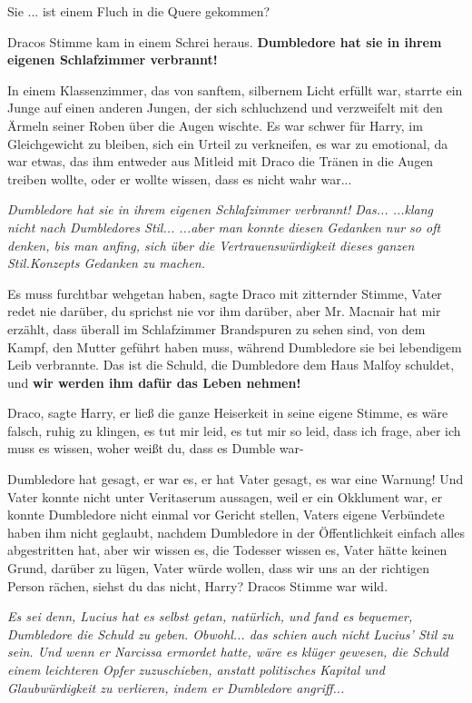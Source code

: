 \glqq Sie ... ist einem Fluch in die Quere gekommen?\grqq{}

Dracos Stimme kam in einem Schrei heraus. \glqq \textbf{Dumbledore hat sie in
ihrem eigenen Schlafzimmer verbrannt!}\grqq{}

In einem Klassenzimmer, das von sanftem, silbernem Licht erfüllt war, starrte
ein Junge auf einen anderen Jungen, der sich schluchzend und verzweifelt mit den
Ärmeln seiner Roben über die Augen wischte. Es war schwer für Harry, im
Gleichgewicht zu bleiben, sich ein Urteil zu verkneifen, es war zu emotional, da
war etwas, das ihm entweder aus Mitleid mit Draco die Tränen in die Augen
treiben wollte, oder er wollte wissen, dass es nicht wahr war...

\emph{Dumbledore hat sie in ihrem eigenen Schlafzimmer verbrannt! Das...
...klang nicht nach Dumbledores Stil... ...aber man konnte diesen Gedanken nur
so oft denken, bis man anfing, sich über die Vertrauenswürdigkeit dieses ganzen
\glqq Stil\grqq{}.Konzepts Gedanken zu machen. }

\glqq Es muss furchtbar wehgetan haben\grqq{}, sagte Draco mit zitternder
Stimme, \glqq Vater redet nie darüber, du sprichst nie vor ihm darüber, aber Mr.
Macnair hat mir erzählt, dass überall im Schlafzimmer Brandspuren zu sehen sind,
von dem Kampf, den Mutter geführt haben muss, während Dumbledore sie bei
lebendigem Leib verbrannte. Das ist die Schuld, die Dumbledore dem Haus Malfoy
schuldet, und \textbf{wir werden ihm dafür das Leben nehmen!}\grqq{}

\glqq Draco\grqq{}, sagte Harry, er ließ die ganze Heiserkeit in seine eigene
Stimme, es wäre falsch, ruhig zu klingen, \glqq es tut mir leid, es tut mir so
leid, dass ich frage, aber ich muss es wissen, woher weißt du, dass es Dumble
war-\grqq{}

\glqq Dumbledore hat gesagt, er war es, er hat Vater gesagt, es war eine
Warnung! Und Vater konnte nicht unter Veritaserum aussagen, weil er ein
Okklument war, er konnte Dumbledore nicht einmal vor Gericht stellen, Vaters
eigene Verbündete haben ihm nicht geglaubt, nachdem Dumbledore in der
Öffentlichkeit einfach alles abgestritten hat, aber wir wissen es, die Todesser
wissen es, Vater hätte keinen Grund, darüber zu lügen, Vater würde wollen, dass
wir uns an der richtigen Person rächen, siehst du das nicht, Harry?\grqq{}
Dracos Stimme war wild.

\emph{Es sei denn, Lucius hat es selbst getan, natürlich, und fand es bequemer, Dumbledore die Schuld zu geben. Obwohl... das schien auch nicht Lucius' Stil zu sein. Und wenn er Narcissa ermordet hatte, wäre es klüger gewesen, die Schuld einem leichteren Opfer zuzuschieben, anstatt politisches Kapital und Glaubwürdigkeit zu verlieren, indem er Dumbledore angriff... }

